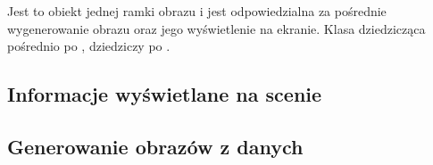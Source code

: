 
Jest to obiekt jednej ramki obrazu i jest odpowiedzialna za pośrednie wygenerowanie obrazu oraz jego wyświetlenie na ekranie.
Klasa dziedzicząca pośrednio po ,  dziedziczy po .

\subsection{Informacje wyświetlane na scenie}


\subsection{Generowanie obrazów z danych}

